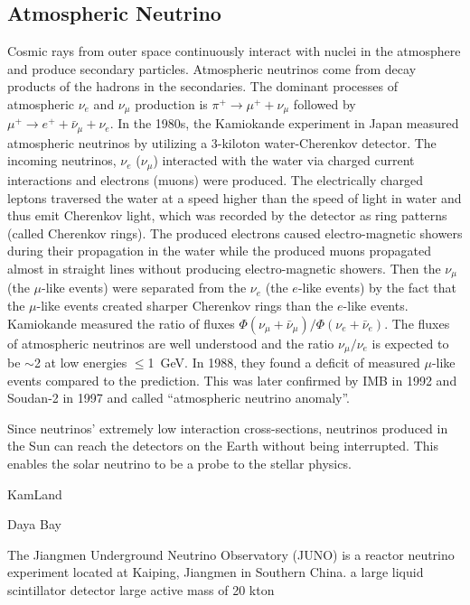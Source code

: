 \subsection{Atmospheric Neutrino}
Cosmic rays from outer space continuously interact with nuclei in the atmosphere and produce secondary particles. Atmospheric neutrinos come from decay products of the hadrons in the secondaries. The dominant processes of atmospheric $\nu_e$ and $\nu_\mu$ production is $\pi^+\to\mu^+ + \nu_\mu$ followed by $\mu^+ \to e^+ + \bar{\nu}_\mu + \nu_e$. In the 1980s, the Kamiokande experiment in Japan measured atmospheric neutrinos by utilizing a 3-kiloton water-Cherenkov detector. The incoming neutrinos, $\nu_e$ ($\nu_\mu$) interacted with the water via charged current interactions and electrons (muons) were produced. The electrically charged leptons traversed the water at a speed higher than the speed of light in water and thus emit Cherenkov light, which was recorded by the detector as ring patterns (called Cherenkov rings). The produced electrons caused electro-magnetic showers during their propagation in the water while the produced muons propagated almost in straight lines without producing electro-magnetic showers. Then the $\nu_\mu$ (the $\mu$-like events) were separated from the $\nu_e$ (the $e$-like events) by the fact that the $\mu$-like events created sharper Cherenkov rings than the $e$-like events. Kamiokande measured the ratio of fluxes $\Phi(\nu_\mu+\bar{\nu}_\mu)/\Phi(\nu_e+\bar{\nu}_e)$. The fluxes of atmospheric neutrinos are well understood and the ratio $\nu_\mu/\nu_e$ is expected to be $\sim$2 at low energies $\leq$1~GeV. In 1988, they found a deficit of measured $\mu$-like events compared to the prediction. This was later confirmed by IMB in 1992\cite{becker1992electron} and Soudan-2 in 1997\cite{allison1997measurement} and called ``atmospheric neutrino anomaly''\cite{kajita2012atmospheric}.



Since neutrinos' extremely low interaction cross-sections, neutrinos produced in the Sun can reach the detectors on the Earth without being interrupted. This enables the solar neutrino to be a probe to the stellar physics.

KamLand

Daya Bay

The Jiangmen Underground Neutrino Observatory (JUNO) is a reactor neutrino experiment located at Kaiping, Jiangmen in Southern China. a large liquid scintillator detector 
large active mass of 20 kton

